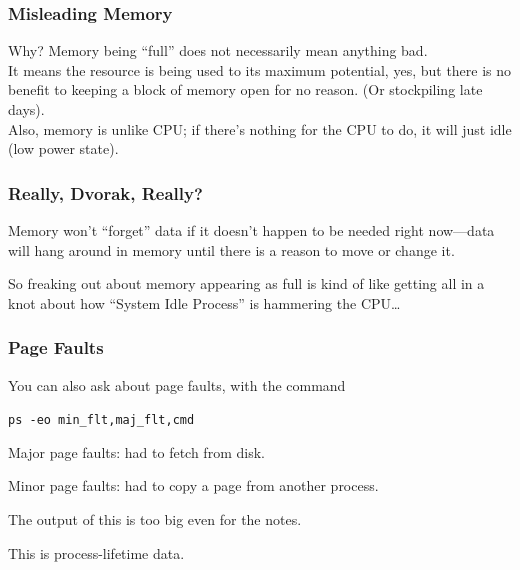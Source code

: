 \begin{frame}
\frametitle{Misleading Memory}


\begin{changemargin}{1cm}
Why? Memory being ``full'' does not necessarily mean anything bad. \\[1em]

It means the resource is being used to its maximum potential, yes, but there is no benefit to keeping a block of memory open for no reason. (Or stockpiling late days).\\[1em]

Also, memory is unlike CPU; if there's nothing for the CPU to do, it will just idle (low power state).
\end{changemargin}

\end{frame}


\begin{frame}
\frametitle{Really, Dvorak, Really?}


\begin{changemargin}{1cm}
Memory won't ``forget'' data if it doesn't happen to be needed right now---data will hang around in memory until there is a reason to move or change it. 

So freaking out about memory appearing as full is kind of like getting all in a knot about how ``System Idle Process'' is hammering the CPU\ldots
\end{changemargin}

\end{frame}




\begin{frame}
\frametitle{Page Faults}


\begin{changemargin}{1cm}
You can also ask about page faults, with the command
\begin{center}
\texttt{ps -eo min\_flt,maj\_flt,cmd}
\end{center}

Major page faults: had to fetch from disk. 

Minor page faults: had to copy a page from another process. 

The output of this is too big even for the notes.

This is process-lifetime data.
\end{changemargin}
\end{frame}



